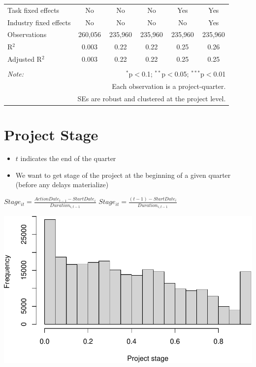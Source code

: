 \documentclass[
]{article}
\providecommand{\tightlist}{%
  \setlength{\itemsep}{0pt}\setlength{\parskip}{0pt}}
\begin{document}
\begin{table}[H]
\begin{tabular}{@{\extracolsep{-2pt}}lccccc}
Task fixed effects & No & No & No & Yes & Yes \\ 
Industry fixed effects & No & No & No & No & Yes \\ 
Observations & 260,056 & 235,960 & 235,960 & 235,960 & 235,960 \\ 
R$^{2}$ & 0.003 & 0.22 & 0.22 & 0.25 & 0.26 \\ 
Adjusted R$^{2}$ & 0.003 & 0.22 & 0.22 & 0.25 & 0.25 \\ 
\hline 
\hline \\[-1.8ex] 
\textit{Note:}  & \multicolumn{5}{r}{$^{*}$p$<$0.1; $^{**}$p$<$0.05; $^{***}$p$<$0.01} \\ 
 & \multicolumn{5}{r}{Each observation is a project-quarter.} \\ 
 & \multicolumn{5}{r}{SEs are robust and clustered at the project level.} \\ 
\end{tabular} 
\end{table}

\hypertarget{project-stage}{%
\section{Project Stage}\label{project-stage}}

\begin{itemize}
\tightlist
\item
  \(t\) indicates the end of the quarter
\item
  We want to get stage of the project at the beginning of a given
  quarter (before any delays materialize)
\end{itemize}

\(Stage_{it}=\frac{ActionDate_{t-1}-StartDate_i}{Duration_{i,t-1}}\)
\(Stage_{it}=\frac{(t-1)-StartDate_i}{Duration_{i,t-1}}\)

\includegraphics{qp_first_pc_delay-2_files/figure-latex/stage_plots_1-1.pdf}
\end{document}
